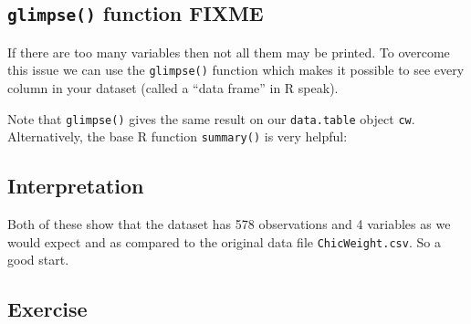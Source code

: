 \documentclass[letterpaperpaper,9pt,twocolumn,twoside,printwatermark=false]{pinp}
\begin{document}
\hypertarget{glimpse-function-fixme}{%
\subsection{\texorpdfstring{\texttt{glimpse()} function
\textbf{FIXME}}{glimpse() function FIXME}}\label{glimpse-function-fixme}}

If there are too many variables then not all them may be printed. To
overcome this issue we can use the \texttt{glimpse()} function which
makes it possible to see every column in your dataset (called a ``data
frame'' in R speak).

Note that \texttt{glimpse()} gives the same result on our
\texttt{data.table} object \texttt{cw}. Alternatively, the base R
function \texttt{summary()} is very helpful:

\begin{Shaded}
\begin{Highlighting}[]
\end{Highlighting}
\end{Shaded}

\hypertarget{interpretation}{%
\subsection{Interpretation}\label{interpretation}}

Both of these show that the dataset has 578 observations and 4 variables
as we would expect and as compared to the original data file
\texttt{ChicWeight.csv}. So a good start.

\hypertarget{exercise-3}{%
\subsection{Exercise}\label{exercise-3}}
\end{document}
